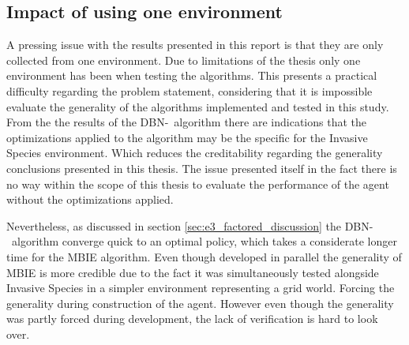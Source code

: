 \subsection{Impact of using one environment }
A pressing issue with the results presented in this report is that they are only collected from one environment. Due to limitations of the thesis only one environment has been when testing the algorithms. This presents a practical difficulty regarding the problem statement, considering that it is impossible evaluate the generality of the algorithms implemented and tested in this study. From the the results of the DBN-\etre\ algorithm there are indications that the optimizations applied to the algorithm may be the specific for the Invasive Species environment. Which reduces the creditability regarding the generality conclusions presented in this thesis. The issue presented itself in the fact there is no way within the scope of this thesis to evaluate the performance of the agent without the optimizations applied. 

Nevertheless, as discussed in section \ref{sec:e3_factored_discussion} the DBN-\etre\ algorithm converge quick to an optimal policy, which takes a considerate longer time for the MBIE algorithm. Even though developed in parallel the generality of MBIE is more credible due to the fact it was simultaneously tested alongside Invasive Species in a simpler environment representing a grid world. Forcing the generality during construction of the agent. However even though the generality was partly forced during development, the lack of verification is hard to look over. 

